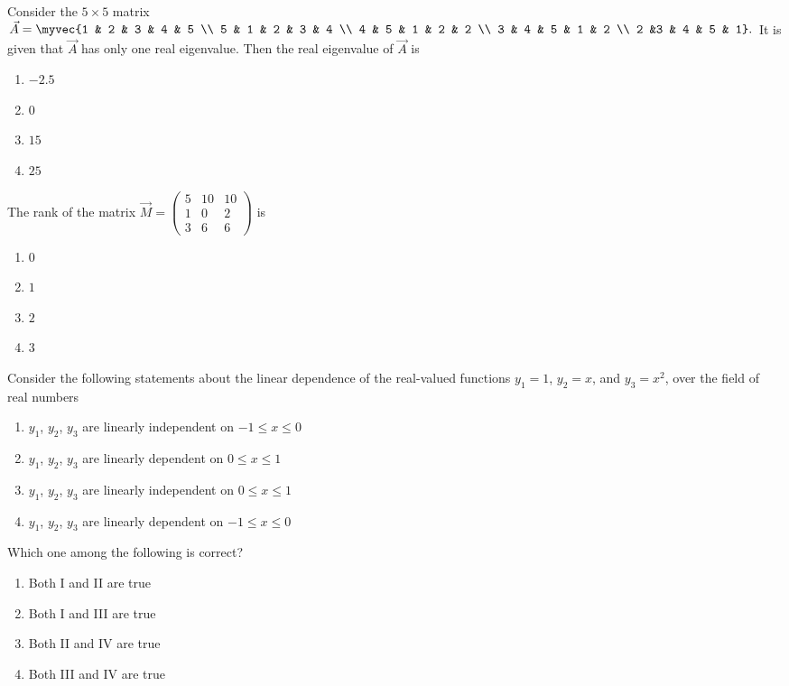 \item Consider the $5 \times 5$ matrix  
$
\vec{A} = \myvec{1 & 2 & 3 & 4 & 5 \\
5 & 1 & 2 & 3 & 4 \\
4 & 5 & 1 & 2 & 2 \\
3 & 4 & 5 & 1 & 2 \\
2 &3 & 4 & 5 & 1}
.$ 
It is given that $\vec{A}$ has only one real eigenvalue. Then the real eigenvalue of $\vec{A}$ is  
\hfill {}
\begin{multicols}{4}
\begin{enumerate}
\item $-2.5$
\item $0$
\item $15$
\item $25$
\end{enumerate}
\end{multicols}
\item The rank of the matrix 
$
\vec{M} = \begin{pmatrix}
5 & 10 & 10 \\
1 & 0 & 2 \\
3 & 6 & 6
\end{pmatrix}
$ is  
\hfill {}
\begin{multicols}{4}
\begin{enumerate}
\item $0$
\item $1$
\item $2$
\item $3$
\end{enumerate}
\end{multicols}
\item Consider the following statements about the linear dependence of the real-valued functions $y_1 = 1$, $y_2 = x$, and $y_3 = x^2$, over the field of real numbers
\begin{enumerate}[label=\Roman*.]
    \item $y_1$, $y_2$, $y_3$ are linearly independent on $-1 \leq x \leq 0$ 
    \item $y_1$, $y_2$, $y_3$ are linearly dependent on $0 \leq x \leq 1$
    \item $y_1$, $y_2$, $y_3$ are linearly independent on $0 \leq x \leq 1$
    \item $y_1$, $y_2$, $y_3$ are linearly dependent on $-1 \leq x \leq 0$
\end{enumerate}
Which one among the following is correct?  
\hfill {}
\begin{multicols}{2}
\begin{enumerate}
\item Both I and II are true
\item Both I and III are true
\item Both II and IV are true
\item Both III and IV are true
\end{enumerate}
\end{multicols}
